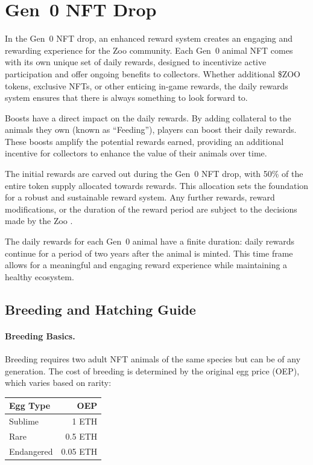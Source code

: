 \section{Gen~0 NFT Drop}

In the Gen~0 NFT drop, an enhanced reward system creates an engaging and rewarding experience for the Zoo community. Each Gen~0 animal NFT comes with its own unique set of daily rewards, designed to incentivize active participation and offer ongoing benefits to collectors. Whether additional \$ZOO tokens, exclusive NFTs, or other enticing in-game rewards, the daily rewards system ensures that there is always something to look forward to.

Boosts have a direct impact on the daily rewards. By adding collateral to the animals they own (known as ``Feeding''), players can boost their daily rewards. These boosts amplify the potential rewards earned, providing an additional incentive for collectors to enhance the value of their animals over time.

The initial rewards are carved out during the Gen~0 NFT drop, with 50\% of the entire token supply allocated towards rewards. This allocation sets the foundation for a robust and sustainable reward system. Any further rewards, reward modifications, or the duration of the reward period are subject to the decisions made by the Zoo \DAO{}.

The daily rewards for each Gen~0 animal have a finite duration: daily rewards continue for a period of two years after the animal is minted. This time frame allows for a meaningful and engaging reward experience while maintaining a healthy ecosystem.

\subsection{Breeding and Hatching Guide}

\paragraph{Breeding Basics.}
Breeding requires two adult NFT animals of the same species but can be of any generation. The cost of breeding is determined by the original egg price (OEP), which varies based on rarity:

\begin{center}
\begin{tabular}{lr}
\toprule
\textbf{Egg Type} & \textbf{OEP} \\
\midrule
Sublime    & 1 ETH \\
Rare       & 0.5 ETH \\
Endangered & 0.05 ETH \\
\bottomrule
\end{tabular}
\end{center}

